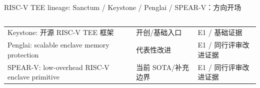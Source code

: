 \begin{frame}[t,shrink=6]{RISC-V TEE lineage: Sanctum / Keystone / Penglai / SPEAR-V：方向开场}
\begin{columns}[T,totalwidth=\textwidth]
\begin{column}{0.49\textwidth}
{\begin{minipage}[t]{0.97\linewidth}
\begin{minipage}{0.92\linewidth}
{\begin{tabularx}{\linewidth}{@{}YYY@{}}
\midrule
Keystone: 开源 RISC-V TEE 框架 & 开创/基础入口 & E1 / 基础证据 \\
Penglai: scalable enclave memory protection & 代表性改进 & E1 / 同行评审改进证据 \\
SPEAR-V: low-overhead RISC-V enclave primitive & 当前 SOTA/补充边界 & E1 / 同行评审改进证据 \\
\bottomrule
\end{tabularx}
}
    \end{minipage}
    \vspace{1mm}
  \end{minipage}}
  \end{column}
\end{columns}
\end{frame}



